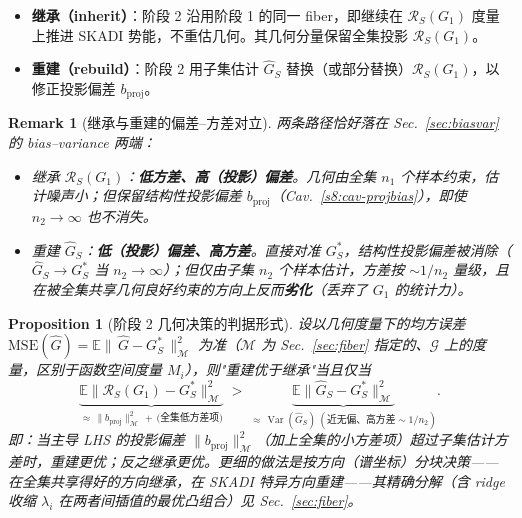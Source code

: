 \documentclass[11pt,a4paper]{article}
\newtheorem{proposition}[theorem]{Proposition}
\newtheorem{remark}[theorem]{Remark}
\DeclareMathOperator{\Var}{Var}
\newcommand{\E}{\mathbb{E}}
\newcommand{\cG}{\mathcal{G}}   %
\newcommand{\Rstr}{\mathcal{R}}     %
\begin{document}
\begin{itemize}[leftmargin=*]
\item \textbf{继承（inherit）}：阶段 2 沿用阶段 1 的同一 fiber，即继续在 $\Rstr_S(G_1)$ 度量上推进 SKADI 势能，不重估几何。其几何分量保留全集投影 $\Rstr_S(G_1)$。
\item \textbf{重建（rebuild）}：阶段 2 用子集估计 $\widehat G_S$ 替换（或部分替换）$\Rstr_S(G_1)$，以修正投影偏差 $b_{\mathrm{proj}}$。
\end{itemize}

\begin{remark}[继承与重建的偏差--方差对立]\label{s8:rem-biasvar}
两条路径恰好落在 Sec.~\ref{sec:biasvar} 的 bias--variance 两端：
\begin{itemize}
\item \emph{继承 $\Rstr_S(G_1)$}：\textbf{低方差、高（投影）偏差}。几何由全集 $n_1$ 个样本约束，估计噪声小；但保留结构性投影偏差 $b_{\mathrm{proj}}$（Cav.~\ref{s8:cav-projbias}），即使 $n_2\to\infty$ 也不消失。
\item \emph{重建 $\widehat G_S$}：\textbf{低（投影）偏差、高方差}。直接对准 $G_S^*$，结构性投影偏差被消除（$\widehat G_S\to G_S^*$ 当 $n_2\to\infty$）；但仅由子集 $n_2$ 个样本估计，方差按 $\sim 1/n_2$ 量级，且在被全集共享几何良好约束的方向上反而\textbf{劣化}（丢弃了 $G_1$ 的统计力）。
\end{itemize}
\end{remark}

\begin{proposition}[阶段 2 几何决策的判据形式]\label{s8:prop-criterion}
设以几何度量下的均方误差 $\mathrm{MSE}(\widehat G)=\E\|\,\widehat G-G_S^*\,\|_{\mathcal M}^2$ 为准（$\mathcal M$ 为 Sec.~\ref{sec:fiber} 指定的、$\cG$ 上的度量，区别于函数空间度量 $M_i$），则"重建优于继承"当且仅当
\begin{equation}\label{s8:eq:criterion}
\underbrace{\E\big\|\Rstr_S(G_1)-G_S^*\big\|_{\mathcal M}^2}_{\approx\,\|b_{\mathrm{proj}}\|^2_{\mathcal M}\,+\,\text{(全集低方差项)}}
\;>\;
\underbrace{\E\big\|\widehat G_S-G_S^*\big\|_{\mathcal M}^2}_{\approx\,\Var(\widehat G_S)\ (\text{近无偏、高方差}\sim 1/n_2)}.
\end{equation}
即：当主导 LHS 的投影偏差 $\|b_{\mathrm{proj}}\|_{\mathcal M}^2$（加上全集的小方差项）超过子集估计方差时，重建更优；反之继承更优。更细的做法是按方向（谱坐标）分块决策——在全集共享得好的方向继承，在 SKADI 特异方向重建——其精确分解（含 ridge 收缩 $\lambda_i$ 在两者间插值的最优凸组合）见 Sec.~\ref{sec:fiber}。
\end{proposition}
\end{document}
